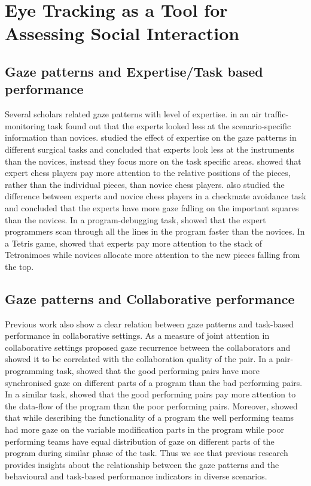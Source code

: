 \documentclass{sig-alternate}
\begin{document}
\section{Eye Tracking as a Tool for Assessing Social Interaction}

\subsection{Gaze patterns and Expertise/Task based performance}

Several scholars related gaze patterns with level of expertise.
\cite{hasse2012measure} in an air traffic-monitoring task found out that the
experts looked less at the scenario-specific information than novices.
\cite{eivazi2012gaze, law2004eye, tien2010measuring} studied the effect of
expertise on the gaze patterns in different surgical tasks and concluded that
experts look less at the instruments than the novices, instead they focus more
on the task specific areas. \cite{reingold2001visual} showed that expert chess
players pay more attention to the relative positions of the pieces, rather than
the individual pieces, than novice chess players. \cite{blignaut2008visual} also
studied the difference between experts and novice chess players in a checkmate
avoidance task and concluded that the experts have more gaze falling on the
important squares than the novices. In a program-debugging task,
\cite{sharif2012eye} showed that the expert programmers scan through all the
lines in the program faster than the novices. In a Tetris game,
\cite{jermann2010using} showed that experts pay more attention to the stack of
Tetronimoes while novices allocate more attention to the new pieces falling from
the top.

\subsection{Gaze patterns and Collaborative performance}

Previous work also show a clear relation between gaze patterns and
task-based performance in collaborative settings. As a measure of joint attention in collaborative settings  \cite{richardson2007art} proposed gaze recurrence between the collaborators and showed it to be correlated with the collaboration quality of the pair. In a pair-programming task, \cite{jermann2012effects} showed that the good performing pairs have more synchronised gaze on different parts of a program than the bad performing pairs. In a similar task, \cite{sharma2012gaze} showed that the good performing pairs pay more attention to the data-flow of the program than the poor performing pairs. Moreover, \cite{sharma2013understanding} showed that while describing the functionality of a program the well performing teams had more gaze on the variable modification parts in the program while poor performing teams have equal distribution of gaze on different parts of the program during similar phase of the task.  Thus we see that previous research provides insights about the relationship between the gaze patterns and the behavioural and task-based performance indicators in diverse scenarios.
\end{document}
